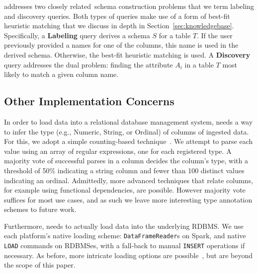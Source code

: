 \systemname addresses two closely related schema construction problems that we term labeling and discovery queries.
Both types of queries make use of a form of best-fit heuristic matching that we discuss in depth in Section~\ref{sec:knowledgebase}.
Specifically, a \textbf{Labeling} query derives a schema $S$ for a table $T$.
If the user previously provided a names for one of the columns, this name is used in the derived schema.
Otherwise, the best-fit heuristic matching is used.
A \textbf{Discovery} query addresses the dual problem: finding the attribute $A_i$ in a table $T$ most likely to match a given column name.

\subsection{Other Implementation Concerns}
In order to load data into a relational database management system, \systemname needs a way to infer the type (e.g., Numeric, String, or Ordinal) of columns of ingested data.  
For this, we adopt a simple counting-based technique~\cite{yang2015lenses}.
We attempt to parse each value using an array of regular expressions, one for each registered type.
A majority vote of successful parses in a column decides the column's type, with a threshold of 50\% indicating a string column and fewer than 100 distinct values indicating an ordinal.
Admittedly, more advanced techniques that relate columns, for example using functional dependencies, are possible.
However majority vote suffices for most use cases, and as such we leave more interesting type annotation schemes to future work.

Furthermore, \systemname needs to actually load data into the underlying RDBMS.  
We use each platform's native loading scheme: \texttt{DataFrameReader}s on Spark, and native \texttt{LOAD} commands on RDBMSes, with a fall-back to manual \texttt{INSERT} operations if necessary.
As before, more intricate loading options are possible~\cite{DBLP:conf/sigmod/AlagiannisBBIA12,DBLP:conf/cidr/IdreosKM07}, but are beyond the scope of this paper.




